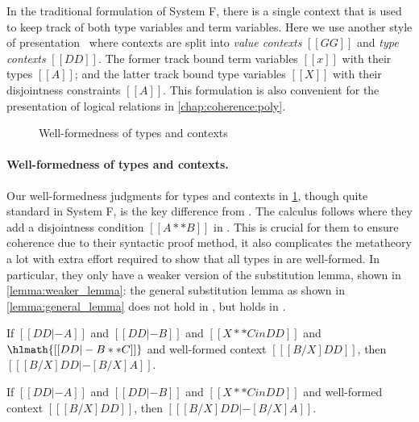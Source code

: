 In the traditional formulation of System F, there is a single context that is
used to keep track of both type variables and term variables. Here we use
another style of presentation~\citep[chap. 16]{Harper_2016} where contexts are
split into \textit{value contexts} $[[GG]]$ and \textit{type contexts} $[[DD]]$.
The former track bound term variables $[[x]]$ with their types $[[A]]$; and the
latter track bound type variables $[[X]]$ with their disjointness constraints
$[[A]]$. This formulation is also convenient for the presentation of logical
relations in \cref{chap:coherence:poly}.

\begin{figure}[t]
  \centering
  \caption{Well-formedness of types and contexts}
  \label{fig:well-formedness:fi}
\end{figure}

\paragraph{Well-formedness of types and contexts.}

Our well-formedness judgments for types and contexts in
\cref{fig:well-formedness:fi}, though quite standard in System F, is the key
difference from \fname. The \fname calculus follows \oname where they add a
disjointness condition $[[ A ** B ]]$ in . This is crucial for
them to ensure coherence due to their syntactic proof method, it also
complicates the metatheory a lot with extra effort required to show that all
types in \fname are well-formed. In particular, they only have a weaker version
of the substitution lemma, shown in \cref{lemma:weaker_lemma}: the general
substitution lemma as shown in \cref{lemma:general_lemma} does not hold in
\fname, but holds in \fnamee.

\begin{lemma} \label{lemma:weaker_lemma}
  If $[[DD |- A]]$ and $[[DD |- B]]$ and $[[ X ** C in DD  ]]$ and $\hlmath{[[ DD |- B ** C ]]}$
  and well-formed context $[[ [ B / X ] DD    ]]$, then $[[  [ B / X ] DD |- [B / X] A      ]]$.
\end{lemma}

\begin{lemma} \label{lemma:general_lemma}
  If $[[DD |- A]]$ and $[[DD |- B]]$ and $[[ X ** C in DD  ]]$
  and well-formed context $[[ [ B / X ] DD    ]]$, then $[[  [ B / X ] DD |- [B / X] A      ]]$.
\end{lemma}



